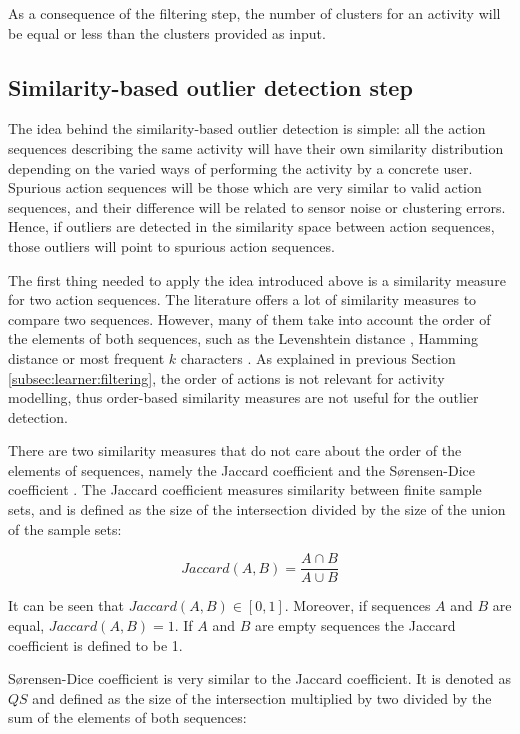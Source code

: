 As a consequence of the filtering step, the number of clusters for an activity will be equal or less than the clusters provided as input.


\subsection{Similarity-based outlier detection step}
\label{subsec:learner:outlier}
The idea behind the similarity-based outlier detection is simple: all the action sequences describing the same activity will have their own similarity distribution depending on the varied ways of performing the activity by a concrete user. Spurious action sequences will be those which are very similar to valid action sequences, and their difference will be related to sensor noise or clustering errors. Hence, if outliers are detected in the similarity space between action sequences, those outliers will point to spurious action sequences. 

The first thing needed to apply the idea introduced above is a similarity measure for two action sequences. The literature offers a lot of similarity measures to compare two sequences. However, many of them take into account the order of the elements of both sequences, such as the Levenshtein distance \cite{Levenshtein1966}, Hamming distance \cite{Hamming1950} or most frequent $k$ characters \cite{Seker2014}. As explained in previous Section \ref{subsec:learner:filtering}, the order of actions is not relevant for activity modelling, thus order-based similarity measures are not useful for the outlier detection.

There are two similarity measures that do not care about the order of the elements of sequences, namely the Jaccard coefficient \cite{A.K.Jain1988} and the S{\o}rensen-Dice coefficient \cite{Sorensen1948}. The Jaccard coefficient measures similarity between finite sample sets, and is defined as the size of the intersection divided by the size of the union of the sample sets:

\begin{equation}
\label{eq-jaccard}
  Jaccard(A, B) = \frac{A \cap B}{A \cup B}
 \end{equation}

It can be seen that $Jaccard(A, B) \in [0, 1]$. Moreover, if sequences $A$ and $B$ are equal, $Jaccard(A, B) = 1$. If $A$ and $B$ are empty sequences the Jaccard coefficient is defined to be 1.

S{\o}rensen-Dice coefficient is very similar to the Jaccard coefficient. It is denoted as $QS$ and defined as the size of the intersection multiplied by two divided by the sum of the elements of both sequences:

